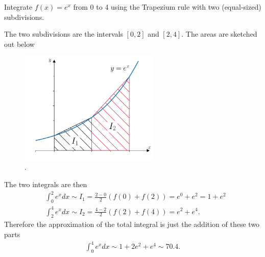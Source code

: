 \exemple{\upline}
{
Integrate $f(x)=e^x$ from 0 to 4 using the Trapezium rule with two (equal-sized) subdivisions.

\noindent The two subdivisions are the intervals $[0,2]$ and $[2,4]$. The areas are sketched out below
\begin{figure}[H]
	\begin{center}
	\includegraphics[width=0.6\textwidth]{figures/ch5_trapezium_example.pdf} 
	  \caption{.} \label{fig:ch5_trapezium_example}
	\end{center}
\end{figure}
The two integrals are then
\begin{align*}
&\int_0^2 e^x dx \sim I_1 = \frac{2-0}{2} \left(f(0) + f(2) \right) = e^0 + e^2 = 1 + e^2 \\
&\int_2^4 e^x dx \sim I_2 = \frac{4-2}{2} \left(f(2) + f(4) \right) = e^2 + e^4.
\end{align*}
Therefore the approximation of the total integral is just the addition of these two parts
\begin{align*}
\int_0^4 e^x dx \sim 1 + 2e^2 + e^4 \sim 70.4.
\end{align*}
}{\downline}

